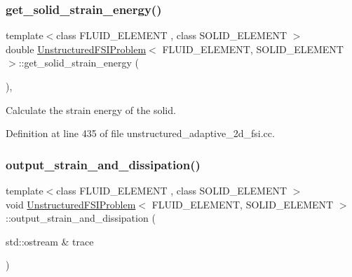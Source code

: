 \subsubsection{\texorpdfstring{get\+\_\+solid\+\_\+strain\+\_\+energy()}{get\_solid\_strain\_energy()}}
{\footnotesize\ttfamily template$<$class F\+L\+U\+I\+D\+\_\+\+E\+L\+E\+M\+E\+NT , class S\+O\+L\+I\+D\+\_\+\+E\+L\+E\+M\+E\+NT $>$ \\
double \hyperlink{classUnstructuredFSIProblem}{Unstructured\+F\+S\+I\+Problem}$<$ F\+L\+U\+I\+D\+\_\+\+E\+L\+E\+M\+E\+NT, S\+O\+L\+I\+D\+\_\+\+E\+L\+E\+M\+E\+NT $>$\+::get\+\_\+solid\+\_\+strain\+\_\+energy (\begin{DoxyParamCaption}{ }\end{DoxyParamCaption})\hspace{0.3cm}{\ttfamily [inline]}, {\ttfamily [private]}}



Calculate the strain energy of the solid. 



Definition at line 435 of file unstructured\+\_\+adaptive\+\_\+2d\+\_\+fsi.\+cc.

\mbox{\label{classUnstructuredFSIProblem_ab6430426df11c9d690539f6d5d4fbf2e}} 
\subsubsection{\texorpdfstring{output\+\_\+strain\+\_\+and\+\_\+dissipation()}{output\_strain\_and\_dissipation()}}
{\footnotesize\ttfamily template$<$class F\+L\+U\+I\+D\+\_\+\+E\+L\+E\+M\+E\+NT , class S\+O\+L\+I\+D\+\_\+\+E\+L\+E\+M\+E\+NT $>$ \\
void \hyperlink{classUnstructuredFSIProblem}{Unstructured\+F\+S\+I\+Problem}$<$ F\+L\+U\+I\+D\+\_\+\+E\+L\+E\+M\+E\+NT, S\+O\+L\+I\+D\+\_\+\+E\+L\+E\+M\+E\+NT $>$\+::output\+\_\+strain\+\_\+and\+\_\+dissipation (\begin{DoxyParamCaption}\item[{std\+::ostream \&}]{trace }\end{DoxyParamCaption})\hspace{0.3cm}{\ttfamily [inline]}}

